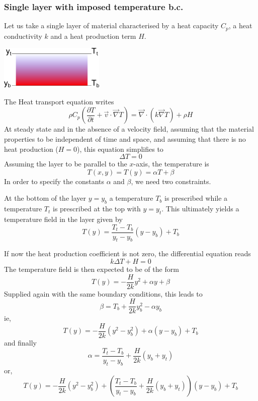 \subsubsection{Single layer with imposed temperature b.c.}

Let us take a single layer of material characterised by
a heat capacity $C_p$, a heat conductivity $k$
and a heat production term $H$.

\begin{center}
\includegraphics[width=5cm]{images/initial_temperature/tempcond.png}
\end{center}

The Heat transport equation writes
\[
\rho C_p ( \frac{\partial T}{\partial t} + {\vec v} \cdot {\vec \nabla} { T}) = 
{\vec \nabla} \cdot (k {\vec \nabla} T) + \rho H
\]
At steady state and in the absence of a velocity field, assuming
that the material properties to be independent of time and space, and 
assuming that
there is no heat production ($H=0$), this equation
simplifies to
\[
\Delta T =0 
\]
Assuming the layer to be parallel to the $x$-axis, the temperature is
\[
T(x,y)=T(y)=\alpha T+ \beta
\]
In order to specify the constants $\alpha$ and $\beta$, we need two constraints.

At the bottom of the layer $y=y_b$ a temperature $T_b$ is prescribed while a temperature
$T_t$ is prescribed at the top with $y=y_t$. This ultimately yields a temperature field in
the layer given by
\[
\boxed{
T(y) = \frac{T_t-T_b}{y_t-y_b}(y-y_b) + T_b
}
\]

If now the heat production coefficient is not zero, the differential equation
reads
\[
 k \Delta T + H = 0 
\]
The temperature field is then expected to be of the form
\[
T(y)= - \frac{H}{2k} y^2 + \alpha y + \beta 
\]
Supplied again with the same boundary conditions, this leads to
\[
\beta=T_b + \frac{H}{2k} y_b^2 - \alpha y_b
\]
ie,
\[
T(y) = -\frac{H}{2k} (y^2-y_b^2) + \alpha (y-y_b) + T_b
\]
and finally
\[
\alpha =  \frac{T_t-T_b}{y_t-y_b}  + \frac{H}{2k}(y_b+y_t)
\]
or,
\[
T(y) = -\frac{H}{2k} (y^2-y_b^2) + \left( \frac{T_t-T_b}{y_t-y_b}  + \frac{H}{2k}(y_b+y_t)   \right) (y-y_b) + T_b
\]

